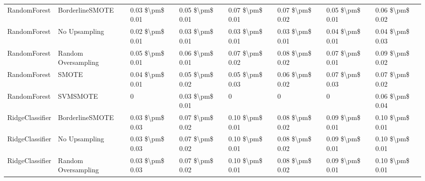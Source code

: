 \begin{tabular}{llllllll}
                   RandomForest &               BorderlineSMOTE & 0.03 \$\textbackslash pm\$ 0.01 &           0.05 \$\textbackslash pm\$ 0.01 &       0.07 \$\textbackslash pm\$ 0.01 &        0.07 \$\textbackslash pm\$ 0.02 &                         0.05 \$\textbackslash pm\$ 0.01 &     0.06 \$\textbackslash pm\$ 0.02 \\
                   RandomForest &                 No Upsampling & 0.02 \$\textbackslash pm\$ 0.01 &           0.03 \$\textbackslash pm\$ 0.01 &       0.03 \$\textbackslash pm\$ 0.01 &        0.03 \$\textbackslash pm\$ 0.01 &                         0.04 \$\textbackslash pm\$ 0.01 &     0.04 \$\textbackslash pm\$ 0.03 \\
                   RandomForest &           Random Oversampling & 0.05 \$\textbackslash pm\$ 0.01 &           0.06 \$\textbackslash pm\$ 0.01 &       0.07 \$\textbackslash pm\$ 0.02 &        0.08 \$\textbackslash pm\$ 0.02 &                         0.07 \$\textbackslash pm\$ 0.01 &     0.09 \$\textbackslash pm\$ 0.02 \\
                   RandomForest &                         SMOTE & 0.04 \$\textbackslash pm\$ 0.01 &           0.05 \$\textbackslash pm\$ 0.02 &       0.05 \$\textbackslash pm\$ 0.03 &        0.06 \$\textbackslash pm\$ 0.02 &                         0.07 \$\textbackslash pm\$ 0.03 &     0.07 \$\textbackslash pm\$ 0.02 \\
                   RandomForest &                      SVMSMOTE &               0 &           0.03 \$\textbackslash pm\$ 0.01 &                     0 &                      0 &                                       0 &     0.06 \$\textbackslash pm\$ 0.04 \\
                RidgeClassifier &               BorderlineSMOTE & 0.03 \$\textbackslash pm\$ 0.03 &           0.07 \$\textbackslash pm\$ 0.02 &       0.10 \$\textbackslash pm\$ 0.01 &        0.08 \$\textbackslash pm\$ 0.02 &                         0.09 \$\textbackslash pm\$ 0.01 &     0.10 \$\textbackslash pm\$ 0.01 \\
                RidgeClassifier &                 No Upsampling & 0.03 \$\textbackslash pm\$ 0.03 &           0.07 \$\textbackslash pm\$ 0.02 &       0.10 \$\textbackslash pm\$ 0.01 &        0.08 \$\textbackslash pm\$ 0.02 &                         0.09 \$\textbackslash pm\$ 0.01 &     0.10 \$\textbackslash pm\$ 0.01 \\
                RidgeClassifier &           Random Oversampling & 0.03 \$\textbackslash pm\$ 0.03 &           0.07 \$\textbackslash pm\$ 0.02 &       0.10 \$\textbackslash pm\$ 0.01 &        0.08 \$\textbackslash pm\$ 0.02 &                         0.09 \$\textbackslash pm\$ 0.01 &     0.10 \$\textbackslash pm\$ 0.01 \\

\end{tabular}
